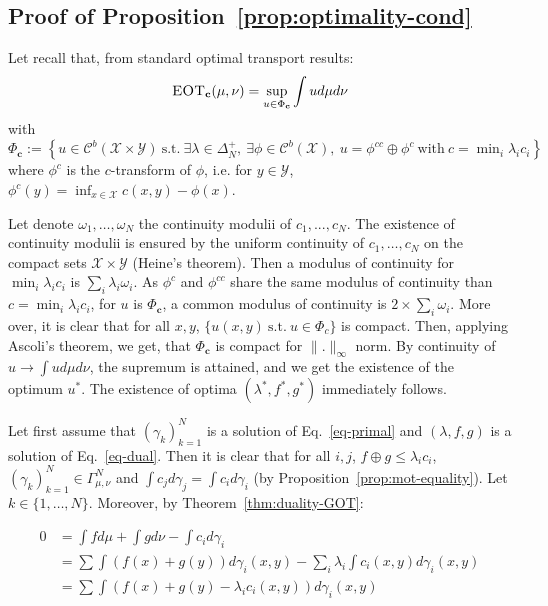 \subsection{Proof of Proposition~\ref{prop:optimality-cond}}
\label{prv:optimality-cond}
\begin{prv*}
Let recall that, from standard optimal transport results:
\begin{align*}
    \textsc{EOT}_\mathbf{c}(\mu,\nu) = \sup_{u\in\Phi_\mathbf{c}}\int u d\mu d\nu
\end{align*}
with $\Phi_\mathbf{c}:=\left\{u\in\mathcal{C}^b(\mathcal{\mathcal{X}\times\mathcal{Y}}) ~\mathrm{s.t.}~ \exists\lambda \in \Delta_N^+,~\exists\phi\in\mathcal{C}^b(\mathcal{X}),~ u =\phi^{cc}\oplus\phi^c~\mathrm{with}~c=\min_i\lambda_ic_i\right\}$ where $\phi^c$ is the $c$-transform of $\phi$, i.e. for $y\in\mathcal{Y}$, $\phi^c(y)=\inf_{x\in\mathcal{X}}c(x,y)-\phi(x)$. 

Let denote $\omega_1,\dots,\omega_N$ the continuity modulii of $c_1,...,c_N$. The existence of continuity modulii is ensured by the uniform continuity of $c_1,\dots,c_N$ on the compact sets $\mathcal{X}\times\mathcal{Y}$ (Heine's theorem). Then a modulus of continuity for $\min_i\lambda_ic_i$ is $\sum_i\lambda_i\omega_i$. As $\phi^c$ and $\phi^{cc}$ share the same modulus of continuity than $c=\min_i\lambda_ic_i$, for $u$ is $\Phi_\mathbf{c}$, a common modulus of continuity is $2\times\sum_i\omega_i$. More over, it is clear that for all $x,y$, $\{u(x,y)~\mathrm{s.t.}~u\in \Phi_c\}$ is compact. Then, applying Ascoli's theorem, we get, that $\Phi_{\mathbf{c}}$ is compact for $\lVert.\rVert_\infty$ norm. By continuity of $u\to\int u d\mu d\nu$, the supremum is attained, and we get the existence of the optimum $u^*$. The existence of optima $(\lambda^*,f^*,g^*)$ immediately follows.

Let first assume that $(\gamma_k)_{k=1}^N$ is a solution of Eq.~\eqref{eq-primal} and $(\lambda,f,g)$ is a solution of Eq.~\eqref{eq-dual}. Then it is clear that for all $i,j$, $f\oplus g\leq \lambda_ic_i$, $(\gamma_k)_{k=1}^N\in\Gamma^N_{\mu,\nu}$ and $\int c_jd\gamma_j=\int c_id\gamma_i$ (by Proposition~\ref{prop:mot-equality}). Let $k\in\{1,\dots,N\}$. Moreover, by Theorem~\ref{thm:duality-GOT}:

\begin{align*}
   0&=\int fd\mu +\int gd\nu -\int c_id\gamma_i\\
    & = \sum \int (f(x)+g(y)) d\gamma_i(x,y)-\sum_i\lambda_i\int c_i(x,y) d\gamma_i(x,y)\\
    & = \sum \int (f(x)+g(y)-\lambda_ic_i(x,y)) d\gamma_i(x,y)\\
\end{align*}


\end{prv*}
